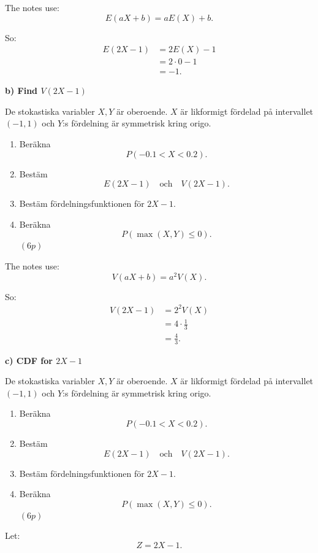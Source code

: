\documentclass[10pt]{article}
\begin{document}
The notes use:
\[
E(aX+b)=aE(X)+b.
\]

So:
\begin{align*}
E(2X-1)
&=
2E(X)-1
\\[2mm]
&=
2\cdot 0-1
\\[2mm]
&=
-1.
\end{align*}

\textbf{b) Find \(V(2X-1)\)}

De stokastiska variabler \(X,Y\) är oberoende.
\(X\) är likformigt fördelad på intervallet
\((-1,1)\) och \(Y\):s fördelning är symmetrisk
kring origo.

\begin{enumerate}[label=\alph*)]
\item Beräkna
\[
P(-0.1<X<0.2).
\]

\item Bestäm
\[
E(2X-1)
\quad\text{och}\quad
V(2X-1).
\]

\item Bestäm fördelningsfunktionen för \(2X-1\).

\item Beräkna
\[
P(\max(X,Y)\le 0).
\]
\((6p)\)
\end{enumerate}

The notes use:
\[
V(aX+b)=a^2V(X).
\]

So:
\begin{align*}
V(2X-1)
&=
2^2V(X)
\\[2mm]
&=
4\cdot \frac13
\\[2mm]
&=
\frac43.
\end{align*}

\textbf{c) CDF for \(2X-1\)}

De stokastiska variabler \(X,Y\) är oberoende.
\(X\) är likformigt fördelad på intervallet
\((-1,1)\) och \(Y\):s fördelning är symmetrisk
kring origo.

\begin{enumerate}[label=\alph*)]
\item Beräkna
\[
P(-0.1<X<0.2).
\]

\item Bestäm
\[
E(2X-1)
\quad\text{och}\quad
V(2X-1).
\]

\item Bestäm fördelningsfunktionen för \(2X-1\).

\item Beräkna
\[
P(\max(X,Y)\le 0).
\]
\((6p)\)
\end{enumerate}

Let:
\[
Z=2X-1.
\]
\end{document}
